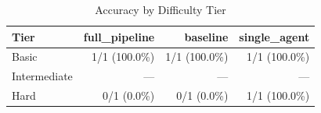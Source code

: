 \begin{table}[htbp]
\centering
\caption{Accuracy by Difficulty Tier}
\label{tab:tier-breakdown}
\begin{tabular}{l rrr}
\toprule
Tier & full\_pipeline & baseline & single\_agent \\
\midrule
  Basic & 1/1 (100.0\%) & 1/1 (100.0\%) & 1/1 (100.0\%) \\
  Intermediate & --- & --- & --- \\
  Hard & 0/1 (0.0\%) & 0/1 (0.0\%) & 1/1 (100.0\%) \\
\bottomrule
\end{tabular}
\end{table}
